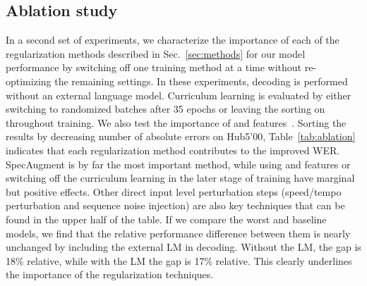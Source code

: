 \documentclass[a4paper]{article}
\begin{document}
\subsection{Ablation study}
In a second set of experiments, we characterize the importance of each of the regularization methods described in Sec.~\ref{sec:methods} for our model performance by switching off one training method at a time without re-optimizing the remaining settings. In these experiments, decoding is performed without an external language model.
Curriculum learning is evaluated by either switching to randomized batches after 35 epochs or leaving the sorting on throughout training.
We also test the importance of  and  features~\cite{Furui1981}.
Sorting the results by decreasing number of absolute errors on Hub5'00, Table~\ref{tab:ablation} indicates that each regularization method contributes to the improved WER.
SpecAugment is by far the most important method, while using  and  features or switching off the curriculum learning in the later stage of training have marginal but positive effects.
Other direct input level perturbation steps (speed/tempo perturbation and sequence noise injection) are also key techniques that can be found in the upper half of the table.
If we compare the worst and baseline models, we find that the relative performance difference between them is nearly unchanged by including the external LM in decoding.
Without the LM, the gap is 18\% relative, while with the LM the gap is 17\% relative.
This clearly underlines the importance of the regularization techniques.
\end{document}

